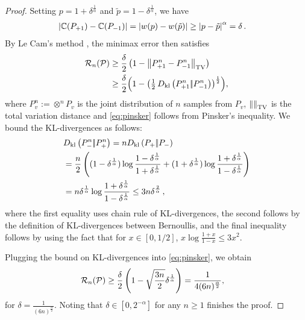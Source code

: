 \begin{proof}
	Setting $p=1 + \delta^{\frac{1}{\alpha}}$ and $\tilde p = 1 - \delta^{\frac{1}{\alpha}}$, we have
	\begin{align*}
		\left|\mathbb{C}(P_{+1}) - \mathbb{C}(P_{-1})\right| &= \left|w(p) - w(\tilde{p})\right| \ge \left|p - \tilde p\right|^\alpha  = \delta\,.
	\end{align*}	 
	By Le Cam's method \cite{yu1997assouad}, the minimax error then satisfies 
	\begin{align}
		\mathcal{R}_n(\mathcal{P}) &  \ge \frac{\delta}{2}\left(1 - \left\|P^n_{+1}- P^n_{-1}\right\|_{\rm TV}\right) \nonumber\\
		&\ge \frac{\delta}{2}\Bigl( 1 - \bigl(\tfrac12\,D_{\rm kl}\left({P^n_{+1}} |\!| {P^n_{-1}} \right)\bigr)^{\frac{1}{2}}\Bigr), \label{eq:pinsker} 
	\end{align}
	where $P^n_{v}:= \otimes^n P_v$ is the joint distribution of $n$ samples from $P_v$, $\left\|\right\|_{\rm TV}$ is the total variation distance and \eqref{eq:pinsker} follows from Pinsker's inequality.
	We bound the KL-divergences as follows: 
	\begin{align*}
		& D_{\rm kl}\left({P^n_{-}} |\!| {P^n_{+}} \right) = n D_{\rm kl}\left({P_{+}} |\!| {P_{-}} \right) \\
		& = \frac{n}{2} 
		\left( (1- \delta^{\frac1{\alpha}}) \log \frac{1-\delta^{\frac1{\alpha}}}{1+ \delta^{\frac1{\alpha}}} +
		        (1+\delta^{\frac1{\alpha}}) \log \frac{1+\delta^{\frac1{\alpha}}}{1-\delta^{\frac1{\alpha}}}\right) \\
		& = n \delta^{\frac1{\alpha}} \log \frac{1+\delta^{\frac1{\alpha}}}{1-\delta^{\frac1{\alpha}}} \le 3n \delta^{\frac2{\alpha}}\,,
	\end{align*}
	where the first equality uses chain rule of KL-divergences, the second follows by the definition of KL-divergences between Bernoullis, and the final inequality follows by using the fact that for $x\in [0,1/2]$, $x \log \frac{1+x}{1-x} \le 3 x^2$. 
	
	Plugging the bound on KL-divergences into \eqref{eq:pinsker}, we obtain
	\begin{align}
		\mathcal{R}_n(\mathcal{P}) &  \ge \frac{\delta}{2}\left(1-\sqrt{\frac{3n}{2}} \delta^{\frac{1}{\alpha}}\right)= \frac1{4(6n)^{\frac{\alpha}{2}}},
	\end{align}
	for $\delta =\frac1{(6n)^{\frac{\alpha}{2}}}$. Noting that $\delta\in [0,2^{-\alpha}]$ for any $n\ge 1$ finishes the proof.
\end{proof}

